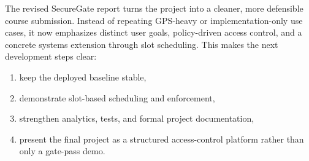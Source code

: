\documentclass[12pt,letterpaper]{article}
\begin{document}
The revised SecureGate report turns the project into a cleaner, more defensible course submission. Instead of repeating GPS-heavy or implementation-only use cases, it now emphasizes distinct user goals, policy-driven access control, and a concrete systems extension through slot scheduling. This makes the next development steps clear:
\begin{enumerate}
    \item keep the deployed baseline stable,
    \item demonstrate slot-based scheduling and enforcement,
    \item strengthen analytics, tests, and formal project documentation,
    \item present the final project as a structured access-control platform rather than only a gate-pass demo.
\end{enumerate}
\end{document}
